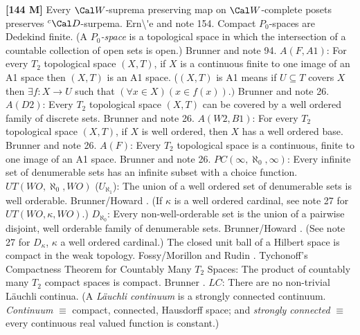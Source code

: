 \smallskip
\item{}{\bf [144 M]}  Every $\Cal W$-suprema preserving map on
$\Cal W$-complete posets preserves $^c\Cal D$-surpema.
\ac{Ern\'e} \cite{2000} and note 154.
\medskip
{}  Compact $P_0$-spaces are Dedekind finite. (A
{\it $P_0$-space} is a topological space in which the intersection of a
countable collection of open sets is open.) \ac{Brunner} \cite{1984c} and
note 94.
\medskip
{}  $A(F,A1)$: For every $T_2$ topological space
$(X,T)$, if $X$ is a continuous finite to one image of an A1 space then
$(X,T)$ is  an A1 space. ($(X,T)$ is A1 means if $U \subseteq  T$ covers
$X$ then $\exists f : X\rightarrow U$ such that $(\forall x\in X)
(x\in f(x)).)$  \ac{Brunner} \cite{1983d} and note 26.
\medskip
{}  $A(D2)$:  Every $T_2$ topological space $(X,T)$
can be covered by a well ordered family of discrete sets. \ac{Brunner}
\cite{1983d} and note 26.
\medskip
{} $A(W2,B1)$: For every $T_2$ topological space
$(X,T)$, if $X$ is well ordered, then $X$ has a well ordered base.
\ac{Brunner} \cite{1983d} and note 26.
\medskip
{}  $A(F)$:  Every $T_2$ topological space is a
continuous, finite to one image of an A1 space. \ac{Brunner} \cite{1983d}
and note 26.
\medskip
{} $PC(\infty,\aleph_0,\infty)$: Every infinite
set of denumerable sets has an infinite subset with a choice function.
\medskip
{} $UT(WO,\aleph_{0},WO)$ ($U_{\aleph_{1}}$):
The union of a well ordered set of denumerable sets is well  orderable.
\ac{Brunner/Howard} \cite{1992}. (If $\kappa$ is a well ordered cardinal,
see note 27 for $UT(WO,\kappa,WO)$.)
\medskip
{} $D_{\aleph_{0}}$: Every non-well-orderable set is
the union of a pairwise disjoint, well orderable family of denumerable
sets.  \ac{Brunner/Howard} \cite{1992}.  (See note 27 for $D_{\kappa}$,
$\kappa$ a well ordered cardinal.)
\medskip
{} The closed unit ball of a Hilbert space is compact
in the weak topology. \ac{Fossy/Morillon} \cite{1998} and
\ac{Rudin} \cite{1991}.
\medskip
{} Tychonoff's Compactness Theorem for Countably
Many $T_2$ Spaces: The product of countably many $T_2$ compact spaces is
compact. \ac{Brunner} \cite{1983c}. 
\medskip
{} $LC$: There are no non-trivial L\"auchli continua.
(A {\it L\"auchli continuum} is a strongly connected continuum. {\it
Continuum} $\equiv$ compact, connected, Hausdorff space; and {\it strongly
connected} $\equiv$ every continuous real valued function is constant.)
